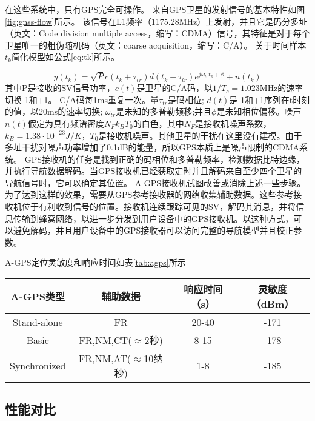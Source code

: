 在这些系统中，只有GPS完全可操作。 来自GPS卫星的发射信号的基本特性如图\ref{fig:gnss-flow}所示。 该信号在L1频率（1175.28MHz）上发射，并且它是码分多址（英文：Code division multiple access，缩写：CDMA）信号，其特征是对于每个卫星唯一的粗伪随机码（英文：coarse acquisition，缩写：C/A）。 关于时间样本$t_{k}$简化模型如公式\ref{eq:tk}所示。

{\setlength\abovedisplayskip{15pt}
\setlength\belowdisplayskip{15pt}
\begin{equation}
    \label{eq:tk}
    y(t_{k})=\sqrt{P}c(t_{k}+\tau_{tr})d(t_{k}+\tau_{tr})e^{j\omega_{tr}t_{k}+\phi}+n(t_{k})
\end{equation}}
其中P是接收的SV信号功率，$c(t)$是卫星的C/A码，以$1/T_{c} = 1.023$MHz的速率切换-1和+1。 C/A码每1ms重复一次。量$\tau_{tr}$是码相位; $d(t)$是-1和+1序列在t时刻的值，以20ms的速率切换; $\omega_{tr}$是未知的多普勒频移;并且$\phi$是未知相位偏移。噪声$n(t)$假定为具有频谱密度$N_{F}k_{B}T_{0}$的白色，其中$N_{F}$是接收机噪声系数，$k_{B} = 1.38\cdot10^{-23} J / K$，$T_{0}$是接收机噪声。其他卫星的干扰在这里没有建模。由于多址干扰对噪声功率增加了0.1dB的能量，所以GPS本质上是噪声限制的CDMA系统。 GPS接收机的任务是找到正确的码相位和多普勒频率，检测数据比特边缘，并执行导航数据解码。当GPS接收机已经获取定时并且解码来自至少四个卫星的导航信号时，它可以确定其位置。 A-GPS接收机试图改善或消除上述一些步骤。为了达到这样的效果，需要从GPS参考接收器的网络收集辅助数据。这些参考接收机位于有利收到信号的位置。接收机连续跟踪可见的SV，解码其消息，并将信息传输到蜂窝网络，以进一步分发到用户设备中的GPS接收机。以这种方式，可以避免解码，并且用户设备中的GPS接收器可以访问完整的导航模型并且校正参数。

A-GPS定位灵敏度和响应时间如表\ref{tab:agps}所示

\begin{table}[!hpb]
    \centering
    \begin{tabular}{@{}cccc@{}} \toprule
        A-GPS类型 & 辅助数据 & 响应时间（s）& 灵敏度（dBm）\\ \midrule
        Stand-alone & FR & 20-40 & -171 \\
        Basic & FR,NM,CT($\approx$2秒) & 8-15 & -178 \\
        Synchronized & FR,NM,AT($\approx$10纳秒) & 1-8 & -185 \\ \bottomrule
    \end{tabular}
\end{table}

\subsection{性能对比}

